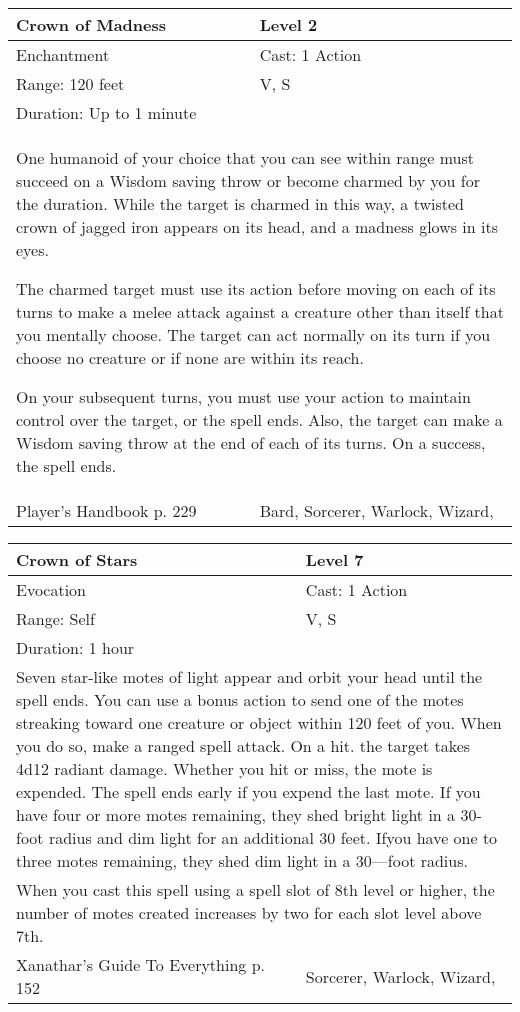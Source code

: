 \documentclass[11pt]{report}
\begin{document}
\begin{table}[H]
	\begin{tabular}{||p{6cm}|p{6cm}||}
		\hline\hline
		\bf{Crown of Madness} & Level 2\\ \hline
		Enchantment & Cast: 1 Action\\ \hline
		Range: 120 feet & V, S\\ \hline
		Duration: Up to 1 minute & \\ \hline
		\multicolumn{2}{||p{12cm}||}{One humanoid of your choice that you can see within range must succeed on a Wisdom saving throw or become charmed by you for the duration. 
While the target is charmed in this way, a twisted crown of jagged iron appears on its head, and a madness glows in its eyes. 

The charmed target must use its action before moving on each of its turns to make a melee attack against a creature other than itself that you mentally choose. The target can act normally on its turn if you choose no creature or if none are within its reach. 

On your subsequent turns, you must use your action to maintain control over the target, or the spell ends. Also, the target can make a Wisdom saving throw at the end of each of its turns. On a success, the spell ends.}\\ \hline
Player's Handbook p. 229 & Bard, Sorcerer, Warlock, Wizard, \\ \hline\hline
	\end{tabular}
\end{table}

\begin{table}[H]
	\begin{tabular}{||p{6cm}|p{6cm}||}
		\hline\hline
		\bf{Crown of Stars} & Level 7\\ \hline
		Evocation & Cast: 1 Action\\ \hline
		Range: Self & V, S\\ \hline
		Duration: 1 hour & \\ \hline
		\multicolumn{2}{||p{12cm}||}{Seven star-like motes of light appear and orbit your head until the spell ends. You can use a bonus action to send one of the motes streaking toward one creature or object within 120 feet of you. When you do so, make a ranged spell attack. On a hit. the target takes 4d12 radiant damage. Whether you hit or miss, the mote is expended. The spell ends early if you expend the last mote. If you have four or more motes remaining, they shed bright light in a 30-foot radius and dim light for an additional 30 feet. Ifyou have one to three motes remaining, they shed dim light in a 30—foot radius.}\\ \hline
		\multicolumn{2}{||p{12cm}||}{When you cast this spell using a spell slot of 8th level or higher, the number of motes created increases by two for each slot level above 7th.}\\ \hline
Xanathar's Guide To Everything p. 152 & Sorcerer, Warlock, Wizard, \\ \hline\hline
	\end{tabular}
\end{table}
\end{document}
